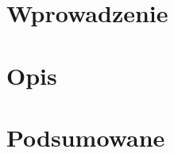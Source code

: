 \documentclass[a4paper, 12pt]{article}
\begin{document}
  

  \leavevmode\thispagestyle{empty}\newpage %


  \tableofcontents
  \section{Wprowadzenie}
  \section{Opis}
  \section{Podsumowane}


  \cite{test}

  
\end{document}

